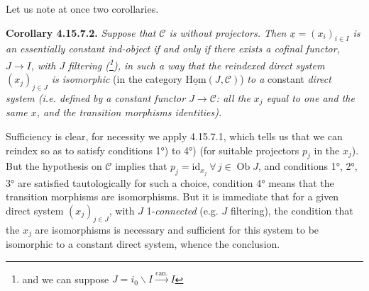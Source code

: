 \documentclass[11pt]{article}
\newcommand{\msp}[1]{\marginpar{\footnotesize [#1]}}
\newcommand{\ux}{\underline{x}}
\newcommand{\cC}{\mathcal{C}}
\newcommand{\Ob}{\operatorname{Ob}}
\newcommand{\id}{\mathrm{id}}
\begin{document}
\msp{page 442}
Let us note at once two corollaries.

\textbf{Corollary 4.15.7.2.} \textit{Suppose that $\cC$ is without projectors. Then $\ux = (x_i)_{i\in I}$ is an essentially constant ind-object if and only if there exists a cofinal functor, $J \longrightarrow I$, with $J$ filtering (\footnote{and we can suppose $J = i_0\backslash I \xrightarrow{\text{can.}} I$}), in such a way that the reindexed direct system $(x_j)_{j\in J}$ is isomorphic} (in the category $\underline{\mathrm{Hom}}(J,\cC)$) \textit{to a} constant \textit{direct system (i.e. defined by a constant functor $J \longrightarrow \cC$: all the $x_j$ equal to one and the same $x$, and the transition morphisms identities).}

Sufficiency is clear, for necessity we apply 4.15.7.1, which tells us that we can reindex so as to satisfy conditions 1°) to 4°) (for suitable projectors $p_j$ in the $x_j$). But the hypothesis on $\cC$ implies that $p_j = \id_{x_j}\ \forall\, j \in \Ob J$, and conditions 1°, 2°, 3° are satisfied tautologically for such a choice, condition 4° means that the transition morphisms are isomorphisms. But it is immediate that for a given direct system $(x_j)_{j\in J}$, with $J$ 1-\textit{connected} (e.g. $J$ filtering), the condition that the $x_j$ are isomorphisms %
is necessary and sufficient for this system to be isomorphic to a constant direct system, whence the conclusion.
\end{document}
